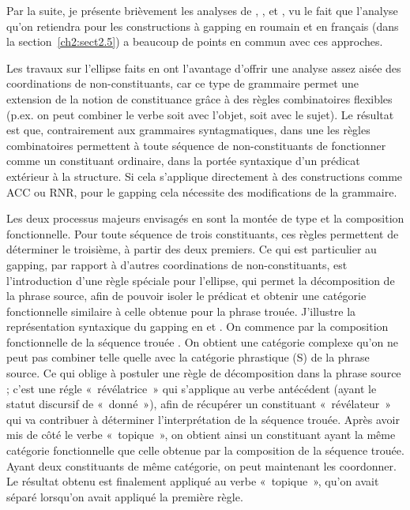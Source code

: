 Par la suite, je présente brièvement les analyses de \citet{Steedman1990,Steedman2000}, \citet{SagEtAl1985}, \citet{Gardent1991} et \citet{CulicoverEtAl2005}, vu le fait que l’analyse qu’on retiendra pour les constructions à gapping en roumain et en français (dans la section~\ref{ch2:sect2.5}) a beaucoup de points en commun avec ces approches. 

Les travaux sur l’ellipse faits en  \citep{Dowty1988,Steedman1990,Steedman2000} ont l’avantage d’offrir une analyse assez aisée des coordinations de non-constituants, car ce type de grammaire permet une extension de la notion de constituance grâce à des règles combinatoires flexibles (p.ex. on peut combiner le verbe soit avec l’objet, soit avec le sujet). Le résultat est que, contrairement aux grammaires syntagmatiques, dans une  les règles combinatoires permettent à toute séquence de non-constituants de fonctionner comme un constituant ordinaire, dans la portée syntaxique d’un prédicat extérieur à la structure. Si cela s’applique directement à des constructions comme ACC ou RNR, pour le gapping cela nécessite des modifications de la grammaire. 

Les deux processus majeurs envisagés en  sont la montée de type et la composition fonctionnelle. Pour toute séquence de trois constituants, ces règles permettent de déterminer le troisième, à partir des deux premiers. Ce qui est particulier au gapping, par rapport à d’autres coordinations de non-constituants, est l’introduction d’une règle spéciale pour l’ellipse, qui permet la décomposition de la phrase source, afin de pouvoir isoler le prédicat et obtenir une catégorie fonctionnelle similaire à celle obtenue pour la phrase trouée. J’illustre la représentation syntaxique du gapping en  et . On commence par la composition fonctionnelle de la séquence trouée . On obtient une catégorie complexe qu’on ne peut pas combiner telle quelle avec la catégorie phrastique (S) de la phrase source. Ce qui oblige à postuler une règle de décomposition dans la phrase source  ; c’est une régle «~révélatrice~» qui s’applique au verbe antécédent (ayant le statut discursif de «~donné~»), afin de récupérer un constituant «~révélateur~» qui va contribuer à déterminer l’interprétation de la séquence trouée. Après avoir mis de côté le verbe «~topique~», on obtient ainsi un constituant ayant la même catégorie fonctionnelle que celle obtenue par la composition de la séquence trouée. Ayant deux constituants de même catégorie, on peut maintenant les coordonner. Le résultat obtenu est finalement appliqué au verbe «~topique~», qu’on avait séparé lorsqu’on avait appliqué la première règle.

